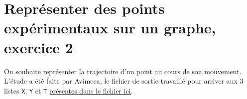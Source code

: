 \documentclass[11pt]{article}
\begin{document}
\newpage







\section{Représenter des points expérimentaux sur un graphe, exercice 2}





\medskip


On souhaite représenter la trajectoire d'un point au cours de son mouvement. L'étude a été faite par Avimeca, le fichier de sortie travaillé pour arriver aux 3 listes \texttt{X}, \texttt{Y} et \texttt{T} \href{https://github.com/formationPythonPC-Juin/aides-formation/blob/master/exercice2-aide.py}{\underline{présentes dans le fichier ici}}.
\end{document}
